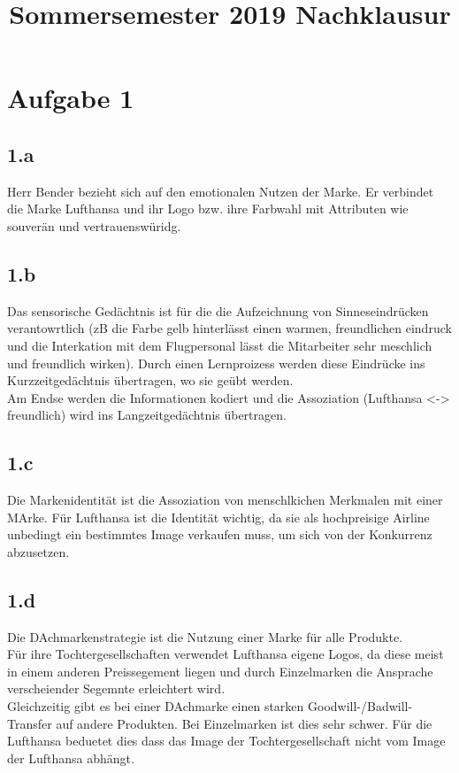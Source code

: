 

\title{Sommersemester 2019 Nachklausur}
\maketitle



\section{Aufgabe 1}
\subsection{1.a}
    Herr Bender bezieht sich auf den emotionalen Nutzen der Marke. Er verbindet die Marke Lufthansa und ihr Logo bzw. ihre Farbwahl mit Attributen wie souverän und vertrauenswüridg.

\subsection{1.b}
    Das sensorische Gedächtnis ist für die die Aufzeichnung von Sinneseindrücken verantowrtlich (zB die Farbe gelb hinterlässt einen warmen, freundlichen eindruck und die Interkation mit dem Flugpersonal lässt die Mitarbeiter sehr meschlich und freundlich wirken). Durch einen Lernproizess werden diese Eindrücke ins Kurzzeitgedächtnis übertragen, wo sie geübt werden. \\
    Am Endse werden die Informationen kodiert und die Assoziation (Lufthansa <-> freundlich) wird ins Langzeitgedächtnis übertragen.

\subsection{1.c}
    Die Markenidentität ist die Assoziation von menschlkichen Merkmalen mit einer MArke. Für Lufthansa ist die Identität wichtig, da sie als hochpreisige Airline unbedingt ein bestimmtes Image verkaufen muss, um sich von der Konkurrenz abzusetzen.

\subsection{1.d}
    Die DAchmarkenstrategie ist die Nutzung einer Marke für alle Produkte. \\
    Für ihre Tochtergesellschaften verwendet Lufthansa eigene Logos, da diese meist in einem anderen Preissegement liegen und durch Einzelmarken die Ansprache verscheiender Segemnte erleichtert wird. \\
    Gleichzeitig gibt es bei einer DAchmarke einen starken Goodwill-/Badwill-Transfer auf andere Produkten. Bei Einzelmarken ist dies sehr schwer. Für die Lufthansa beduetet dies dass das Image der Tochtergesellschaft nicht vom Image der Lufthansa abhängt. \\


